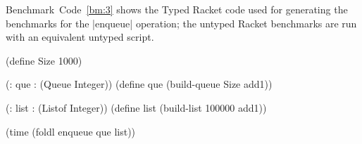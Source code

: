 Benchmark~Code~\ref{bm:3} shows the Typed Racket code used for
generating the benchmarks for the \scheme|enqueue| operation; the
untyped Racket benchmarks are run with an equivalent untyped script.



\begin{benchmark}
 \begin{schemedisplay}
   (define Size 1000)

   (: que : (Queue Integer))
   (define que (build-queue Size add1))

   (: list : (Listof Integer))
   (define list (build-list 100000 add1))

   (time (foldl enqueue que list))

 \end{schemedisplay}
 \label{bm:3}
\end{benchmark}



